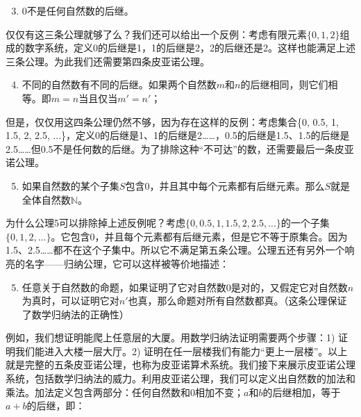 \documentclass[b5paper]{ctexart}
\begin{document}
\begin{enumerate}[公理1)]
  \setcounter{enumi}{2}
  \item 0不是任何自然数的后继。
\end{enumerate}

仅仅有这三条公理就够了么？我们还可以给出一个反例：考虑有限元素$\{0, 1, 2\}$组成的数字系统，定义0的后继是1，1的后继是2，2的后继还是2。这样也能满足上述三条公理。为此我们还需要第四条皮亚诺公理。

\begin{enumerate}[公理1)]
  \setcounter{enumi}{3}
  \item 不同的自然数有不同的后继。如果两个自然数$m$和$n$的后继相同，则它们相等。即$m = n$当且仅当$m' = n'$；
\end{enumerate}

但是，仅仅用这四条公理仍然不够，因为存在这样的反例：考虑集合\{0, 0.5, 1, 1.5, 2, 2.5, ...\}，定义0的后继是1、1的后继是2……，0.5的后继是1.5、1.5的后继是2.5……但0.5不是任何数的后继。为了排除这种“不可达”的数，还需要最后一条皮亚诺公理。

\begin{enumerate}[公理1)]
  \setcounter{enumi}{4}
  \item 如果自然数的某个子集$S$包含0，并且其中每个元素都有后继元素。那么$S$就是全体自然数$\mathbb{N}$。
\end{enumerate}

 
为什么公理5可以排除掉上述反例呢？考虑$\{0, 0.5, 1, 1.5, 2, 2.5, ...\}$的一个子集$\{0, 1, 2, ...\}$。它包含0，并且每个元素都有后继元素，但是它不等于原集合。因为1.5、2.5……都不在这个子集中。所以它不满足第五条公理。公理五还有另外一个响亮的名字——归纳公理，它可以这样被等价地描述：

\begin{enumerate}[公理1)]
  \setcounter{enumi}{4}
  \item 任意关于自然数的命题，如果证明了它对自然数0是对的，又假定它对自然数$n$为真时，可以证明它对$n'$也真，那么命题对所有自然数都真。（这条公理保证了数学归纳法的正确性）
\end{enumerate}

例如，我们想证明能爬上任意层的大厦。用数学归纳法证明需要两个步骤：1) 证明我们能进入大楼一层大厅。2) 证明在任一层楼我们有能力“更上一层楼”。以上就是完整的五条皮亚诺公理，也称为皮亚诺算术系统。我们接下来展示皮亚诺公理系统，包括数学归纳法的威力。利用皮亚诺公理，我们可以定义出自然数的加法和乘法。加法定义包含两部分：任何自然数和0相加不变；$a$和$b$的后继相加，等于$a + b$的后继，即：
\end{document}
